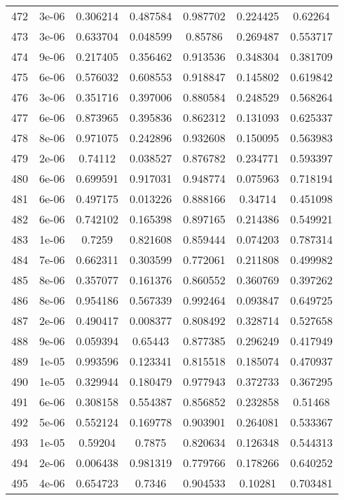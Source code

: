 \begin{table}
\begin{tabular*}{\linewidth}{c|c|c|c|c|c|c}
472 & 3e-06 & 0.306214 & 0.487584 & 0.987702 & 0.224425 & 0.62264\\
473 & 3e-06 & 0.633704 & 0.048599 & 0.85786 & 0.269487 & 0.553717\\
474 & 9e-06 & 0.217405 & 0.356462 & 0.913536 & 0.348304 & 0.381709\\
475 & 6e-06 & 0.576032 & 0.608553 & 0.918847 & 0.145802 & 0.619842\\
476 & 3e-06 & 0.351716 & 0.397006 & 0.880584 & 0.248529 & 0.568264\\
477 & 6e-06 & 0.873965 & 0.395836 & 0.862312 & 0.131093 & 0.625337\\
478 & 8e-06 & 0.971075 & 0.242896 & 0.932608 & 0.150095 & 0.563983\\
479 & 2e-06 & 0.74112 & 0.038527 & 0.876782 & 0.234771 & 0.593397\\
480 & 6e-06 & 0.699591 & 0.917031 & 0.948774 & 0.075963 & 0.718194\\
481 & 6e-06 & 0.497175 & 0.013226 & 0.888166 & 0.34714 & 0.451098\\
482 & 6e-06 & 0.742102 & 0.165398 & 0.897165 & 0.214386 & 0.549921\\
483 & 1e-06 & 0.7259 & 0.821608 & 0.859444 & 0.074203 & 0.787314\\
484 & 7e-06 & 0.662311 & 0.303599 & 0.772061 & 0.211808 & 0.499982\\
485 & 8e-06 & 0.357077 & 0.161376 & 0.860552 & 0.360769 & 0.397262\\
486 & 8e-06 & 0.954186 & 0.567339 & 0.992464 & 0.093847 & 0.649725\\
487 & 2e-06 & 0.490417 & 0.008377 & 0.808492 & 0.328714 & 0.527658\\
488 & 9e-06 & 0.059394 & 0.65443 & 0.877385 & 0.296249 & 0.417949\\
489 & 1e-05 & 0.993596 & 0.123341 & 0.815518 & 0.185074 & 0.470937\\
490 & 1e-05 & 0.329944 & 0.180479 & 0.977943 & 0.372733 & 0.367295\\
491 & 6e-06 & 0.308158 & 0.554387 & 0.856852 & 0.232858 & 0.51468\\
492 & 5e-06 & 0.552124 & 0.169778 & 0.903901 & 0.264081 & 0.533367\\
493 & 1e-05 & 0.59204 & 0.7875 & 0.820634 & 0.126348 & 0.544313\\
494 & 2e-06 & 0.006438 & 0.981319 & 0.779766 & 0.178266 & 0.640252\\
495 & 4e-06 & 0.654723 & 0.7346 & 0.904533 & 0.10281 & 0.703481\\
\end{tabular*}
\end{table}
